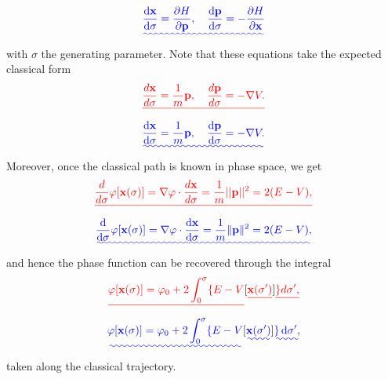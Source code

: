 \documentclass[a4paper,10pt]{paper}
\providecommand{\DIFadd}[1]{{\protect\color{blue}\uwave{#1}}} %
\providecommand{\DIFdel}[1]{{\protect\color{red}\sout{#1}}}                      %
\providecommand{\DIFaddbegin}{} %
\providecommand{\DIFaddend}{} %
\providecommand{\DIFdelbegin}{} %
\providecommand{\DIFdelend}{} %
\begin{document}
\begin{enumerate}
\begin{equation*}
    \DIFadd{\frac{\ddns\mathbf{x}}{\ddns\sigma}=\frac{\partial H}{\partial \mathbf{p}}, \quad \frac{\ddns\mathbf{p}}{\ddns\sigma}=-\frac{\partial H}{\partial \mathbf{x}}
}\end{equation*}\DIFaddend 
with $\sigma$ the generating parameter. Note that these equations take the expected classical form
\DIFdelbegin \begin{displaymath}
    \DIFdel{\frac{d\mathbf{x}}{d\sigma}=\frac{1}{m}\mathbf{p},\quad \frac{d\mathbf{p}}{d\sigma}=-\nabla V.
}\end{displaymath}%
\DIFdelend \DIFaddbegin \begin{equation*}
    \DIFadd{\frac{\ddns\mathbf{x}}{\ddns\sigma}=\frac{1}{m}\mathbf{p},\quad \frac{\ddns\mathbf{p}}{\ddns\sigma}=-\nabla V.
}\end{equation*}\DIFaddend 
Moreover, once the classical path is known in phase space, we get
\DIFdelbegin \begin{displaymath}
    \DIFdel{\frac{d}{d\sigma}\varphi[\mathbf{x}(\sigma)]=\nabla\varphi\cdot\frac{d\mathbf{x}}{d\sigma}=\frac{1}{m}||\mathbf{p}||^{2}=2(E-V),
}\end{displaymath}%
\DIFdelend \DIFaddbegin \begin{equation*}
    \DIFadd{\frac{\ddns}{\ddns\sigma}\varphi[\mathbf{x}(\sigma)]=\nabla\varphi\cdot\frac{\ddns\mathbf{x}}{\ddns\sigma}=\frac{1}{m}\|\mathbf{p}\|^{2}=2(E-V),
}\end{equation*}\DIFaddend 
and hence the phase function can be recovered through the integral
\DIFdelbegin \begin{displaymath}
    \DIFdel{\varphi[\mathbf{x}(\sigma)]=\varphi_{0}+2\int_{0}^{\sigma}\{E-V}[\DIFdel{\mathbf{x}(\sigma')}]\DIFdel{\}d\sigma',
}\end{displaymath}%
\DIFdelend \DIFaddbegin \begin{equation*}
    \DIFadd{\varphi[\mathbf{x}(\sigma)]=\varphi_{0}+2\int_{0}^{\sigma}\{E-V}[\DIFadd{\mathbf{x}(\sigma')}]\DIFadd{\}\dd\sigma',
}\end{equation*}\DIFaddend 
taken along the classical trajectory.


\end{enumerate}
\end{document}
